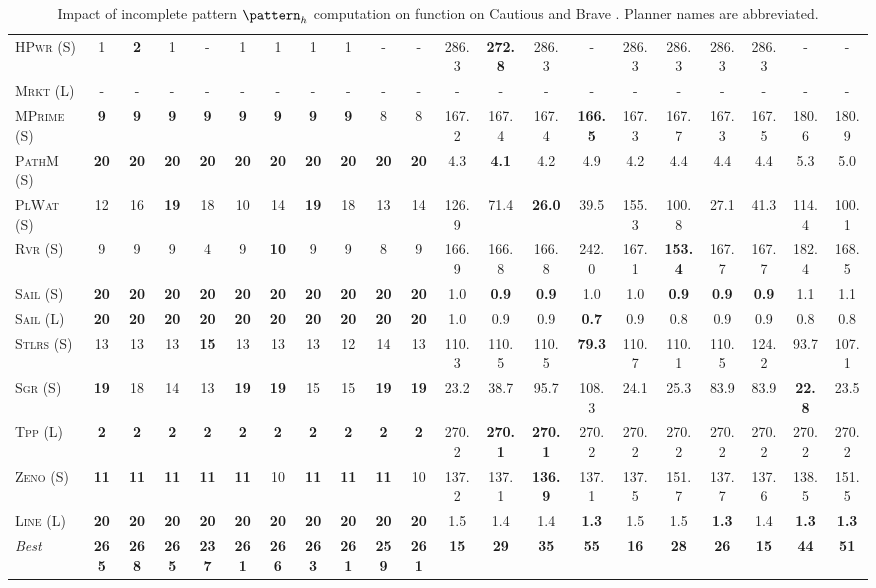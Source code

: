 \begin{table}[tb]
{\begin{tabular}{|l||cccccccccc||cccccccccc||}
\textsc{HPwr} (S)&1&\textbf{2}&1&-&1&1&1&1&-&-&286.3&\textbf{272.8}&286.3&-&286.3&286.3&286.3&286.3&-&-\\
\textsc{Mrkt} (L)&-&-&-&-&-&-&-&-&-&-&-&-&-&-&-&-&-&-&-&-\\
\textsc{MPrime} (S)&\textbf{9}&\textbf{9}&\textbf{9}&\textbf{9}&\textbf{9}&\textbf{9}&\textbf{9}&\textbf{9}&8&8&167.2&167.4&167.4&\textbf{166.5}&167.3&167.7&167.3&167.5&180.6&180.9\\
\textsc{PathM} (S)&\textbf{20}&\textbf{20}&\textbf{20}&\textbf{20}&\textbf{20}&\textbf{20}&\textbf{20}&\textbf{20}&\textbf{20}&\textbf{20}&4.3&\textbf{4.1}&4.2&4.9&4.2&4.4&4.4&4.4&5.3&5.0\\
\textsc{PlWat} (S)&12&16&\textbf{19}&18&10&14&\textbf{19}&18&13&14&126.9&71.4&\textbf{26.0}&39.5&155.3&100.8&27.1&41.3&114.4&100.1\\
\textsc{Rvr} (S)&9&9&9&4&9&\textbf{10}&9&9&8&9&166.9&166.8&166.8&242.0&167.1&\textbf{153.4}&167.7&167.7&182.4&168.5\\
\textsc{Sail} (S)&\textbf{20}&\textbf{20}&\textbf{20}&\textbf{20}&\textbf{20}&\textbf{20}&\textbf{20}&\textbf{20}&\textbf{20}&\textbf{20}&1.0&\textbf{0.9}&\textbf{0.9}&1.0&1.0&\textbf{0.9}&\textbf{0.9}&\textbf{0.9}&1.1&1.1\\
\textsc{Sail} (L)&\textbf{20}&\textbf{20}&\textbf{20}&\textbf{20}&\textbf{20}&\textbf{20}&\textbf{20}&\textbf{20}&\textbf{20}&\textbf{20}&1.0&0.9&0.9&\textbf{0.7}&0.9&0.8&0.9&0.9&0.8&0.8\\
\textsc{Stlrs} (S)&13&13&13&\textbf{15}&13&13&13&12&14&13&110.3&110.5&110.5&\textbf{79.3}&110.7&110.1&110.5&124.2&93.7&107.1\\
\textsc{Sgr} (S)&\textbf{19}&18&14&13&\textbf{19}&\textbf{19}&15&15&\textbf{19}&\textbf{19}&23.2&38.7&95.7&108.3&24.1&25.3&83.9&83.9&\textbf{22.8}&23.5\\
\textsc{Tpp} (L)&\textbf{2}&\textbf{2}&\textbf{2}&\textbf{2}&\textbf{2}&\textbf{2}&\textbf{2}&\textbf{2}&\textbf{2}&\textbf{2}&270.2&\textbf{270.1}&\textbf{270.1}&270.2&270.2&270.2&270.2&270.2&270.2&270.2\\
\textsc{Zeno} (S)&\textbf{11}&\textbf{11}&\textbf{11}&\textbf{11}&\textbf{11}&10&\textbf{11}&\textbf{11}&\textbf{11}&10&137.2&137.1&\textbf{136.9}&137.1&137.5&151.7&137.7&137.6&138.5&151.5\\
\textsc{Line} (L)&\textbf{20}&\textbf{20}&\textbf{20}&\textbf{20}&\textbf{20}&\textbf{20}&\textbf{20}&\textbf{20}&\textbf{20}&\textbf{20}&1.5&1.4&1.4&\textbf{1.3}&1.5&1.5&\textbf{1.3}&1.4&\textbf{1.3}&\textbf{1.3}
\\\hline
\textit{Best}&\textbf{265}&\textbf{268}&\textbf{265}&\textbf{237}&\textbf{261}&\textbf{266}&\textbf{263}&\textbf{261}&\textbf{259}&\textbf{261}&\textbf{15}&\textbf{29}&\textbf{35}&\textbf{55}&\textbf{16}&\textbf{28}&\textbf{26}&\textbf{15}&\textbf{44}&\textbf{51}\\\hline

        \end{tabular}}
        \caption{Impact of incomplete pattern $\pattern_h$ computation on function on Cautious and Brave \pattyd. Planner names are abbreviated.}
        \label{tab:abl-patternh-incomplete}
        \end{table}
        
